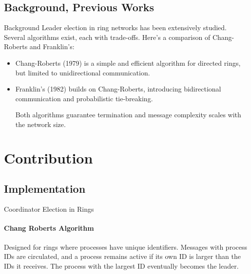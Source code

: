 \documentclass[11pt]{beamer}              %
\begin{document}

\subsection{Background, Previous Works}
\begin{frame}{Background}
Leader election in ring networks has been extensively studied. Several algorithms exist, each with trade-offs. Here's a comparison of Chang-Roberts and Franklin's:
\begin{itemize}

\item Chang-Roberts (1979) is a simple and efficient algorithm for directed rings, but limited to unidirectional communication.
    
\item Franklin's (1982) builds on Chang-Roberts, introducing bidirectional communication and probabilistic tie-breaking.
        
Both algorithms guarantee termination and message complexity scales with the network size.
\end{itemize}

\end{frame}




\section{Contribution}
\subsection{Implementation}
\begin{frame}{Coordinator Election in Rings}
\framesubtitle{Chang Roberts Algorithm}
Designed for rings where processes have unique identifiers. Messages with process IDs are circulated, and a process remains active if its own ID is larger than the IDs it receives. The process with the largest ID eventually becomes the leader.
\note{
}
\end{frame}
\end{document}
